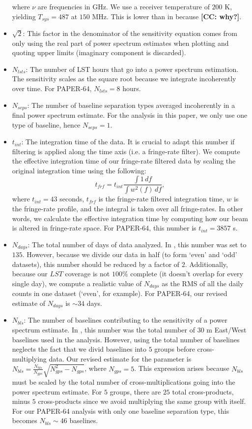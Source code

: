 \documentclass[preprint2,numberedappendix,tighten]{aastex6}  %
\newcommand{\cc}[1]{{\color{purple} \textbf{[CC: #1]}}}
\begin{document}
\begin{itemize}
where $\nu$ are frequencies in GHz. We use a receiver temperature of $200$ K, yielding $T_{sys} = 487$ at $150$ MHz. This is lower than in \citet{ali_et_al2015} because \cc{why?}.
\item $\sqrt{2}$: This factor in the denominator of the sensitivity equation comes from only using the real part of power spectrum estimates when plotting and quoting upper limits (imaginary component is discarded).
\item $N_{lsts}$: The number of LST hours that go into a power spectrum estimation. The sensitivity scales as the square root because we integrate incoherently over time. For PAPER-64, $N_{lsts} = 8$ hours.
\item $N_{seps}$: The number of baseline separation types averaged incoherently in a final power spectrum estimate. For the analysis in this paper, we only use one type of baseline, hence $N_{seps}=1$.
\item $t_{int}$: The integration time of the data. It is crucial to adapt this number if filtering is applied along the time axis (i.e. a fringe-rate filter). We compute the effective integration time of our fringe-rate filtered data by scaling the original integration time using the following:
\begin{equation}
t_{frf} = t_{int} \frac{\int1 \, df}{\int w^{2}(f) \,df},
\end{equation}
where $t_{int}=43$ seconds, $t_{frf}$ is the fringe-rate filtered integration time, $w$ is the fringe-rate profile, and the integral is taken over all fringe-rates. In other words, we calculate the effective integration time by computing how our beam is altered in fringe-rate space. For PAPER-64, this number is $t_{int} = 3857$ s. 
\item $N_{days}$: The total number of days of data analyzed. In \citet{ali_et_al2015}, this number was set to $135$. However, because we divide our data in half (to form `even' and `odd' datasets), this number should be reduced by a factor of $2$. Additionally, because our $LST$ coverage is not $100\%$ complete (it doesn't overlap for every single day), we compute a realistic value of $N_{days}$ as the RMS of all the daily counts in one dataset (`even', for example). For PAPER-64, our revised estimate of $N_{days}$ is $\sim34$ days.
\item $N_{bls}$: The number of baselines contributing to the sensitivity of a power spectrum estimate. In \citet{ali_et_al2015}, this number was the total number of $30$ m East/West baselines used in the analysis. However, using the total number of baselines neglects the fact that we divid baselines into $5$ groups before cross-multiplying data. Our revised estimate for the parameter is $N_{bls} = \frac{N_{bls}}{N_{gps}}\sqrt{N_{gps}^{2}-N_{gps}}$, where $N_{gps} = 5$. This expression arises because $N_{bls}$ must be scaled by the total number of cross-multiplications going into the power spectrum estimate. For $5$ groups, there are $25$ total cross-products, minus $5$ cross-products since we avoid multiplying the same group with itself. For our PAPER-64 analysis with only one baseline separation type, this becomes $N_{bls} \sim 46$ baselines. 

\end{itemize}
\end{document}
